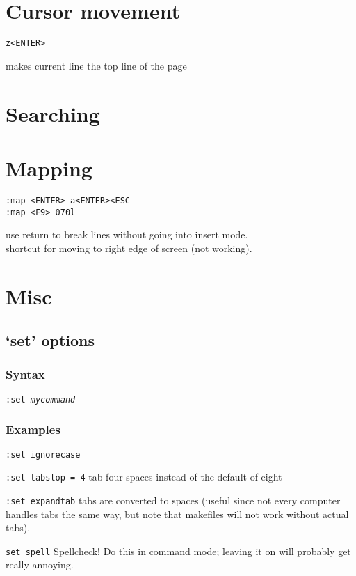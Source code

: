\documentclass[12pt]{article}
\begin{document}
\section{Cursor movement}
\begin{minipage}[t]{0.2\textwidth}
    \texttt{z<ENTER>}\\
\end{minipage}
\begin{minipage}[t]{0.8\textwidth}
    makes current line the top line of the page\\
\end{minipage}

\section{Searching}

\section{Mapping}
\begin{minipage}[t]{0.4\textwidth}
    \texttt{:map <ENTER> a<ENTER><ESC}\\
    \texttt{:map <F9> 070l}\\
\end{minipage}
\begin{minipage}[t]{0.7\textwidth}
    use return to break lines without going into insert mode.\\
    shortcut for moving to right edge of screen (not working).\\
\end{minipage}

\section{Misc}

\subsection{`set' options}
\subsubsection{Syntax}
\texttt{:set \emph{mycommand}}
\subsubsection{Examples}
\par\texttt{:set ignorecase}
\par\texttt{:set tabstop = 4} tab four spaces instead of the default of eight
\par\texttt{:set expandtab} tabs are converted to spaces (useful since not every
computer handles tabs the same way, but note that makefiles will not
work without actual tabs).
\par\texttt{set spell} Spellcheck! Do this in command mode; leaving it on
will probably get really annoying.
\end{document}
